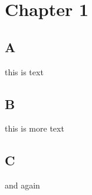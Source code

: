 \chapter{Chapter 1}
\minitoc%

\section{A}
this is text
\section{B}
this is more text
\section{C}
and again